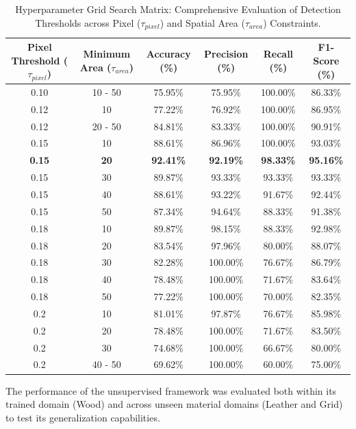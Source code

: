 \documentclass[10pt,twocolumn,a4paper]{article}
\begin{document}
 \begin{table}[t]
\centering
\caption{Hyperparameter Grid Search Matrix: Comprehensive Evaluation of Detection Thresholds across Pixel ($\tau_{pixel}$) and Spatial Area ($\tau_{area}$) Constraints.}
\label{tab:grid_search}
\begin{tabular}{cccccc}
\toprule
\textbf{Pixel Threshold ($\tau_{pixel}$)} & \textbf{Minimum Area ($\tau_{area}$)} & \textbf{Accuracy (\%)} & \textbf{Precision (\%)} & \textbf{Recall (\%)} & \textbf{F1-Score (\%)} \\ \midrule
0.10 & 10 - 50 & 75.95\% & 75.95\% & 100.00\% & 86.33\% \\
 \midrule
0.12 & 10 & 77.22\% & 76.92\% & 100.00\% & 86.95\% \\
0.12 & 20 - 50 & 84.81\% & 83.33\% & 100.00\% & 90.91\% \\ \midrule
0.15 & 10 & 88.61\% & 86.96\% & 100.00\% & 93.03\% \\
\textbf{0.15} & \textbf{20} & \textbf{92.41\%} & \textbf{92.19\%} & \textbf{98.33\%} & \textbf{95.16\%} \\
0.15 & 30 & 89.87\% & 93.33\% & 93.33\% & 93.33\% \\
0.15 & 40 & 88.61\% & 93.22\% & 91.67\% & 92.44\% \\
0.15 & 50 & 87.34\% & 94.64\% & 88.33\% & 91.38\% \\ \midrule
0.18 & 10 & 89.87\% & 98.15\% & 88.33\% & 92.98\% \\
0.18 & 20 & 83.54\% & 97.96\% & 80.00\% & 88.07\% \\
0.18 & 30 & 82.28\% & 100.00\% & 76.67\% & 86.79\% \\
0.18 & 40 & 78.48\% & 100.00\% & 71.67\% & 83.64\% \\
0.18 & 50 & 77.22\% & 100.00\% & 70.00\% & 82.35\% \\ \midrule

0.2 & 10 & 81.01\% & 97.87\% & 76.67\% & 85.98\% \\

0.2 & 20 & 78.48\% & 100.00\% & 71.67\% & 83.50\% \\

0.2 & 30 & 74.68\% & 100.00\% & 66.67\% & 80.00\% \\

0.2 & 40 - 50 & 69.62\% & 100.00\% & 60.00\% & 75.00\% \\ \bottomrule
\end{tabular}
\end{table}

The performance of the unsupervised framework was evaluated both within its trained domain (Wood) and across unseen material domains (Leather and Grid) to test its generalization capabilities.
\end{document}
